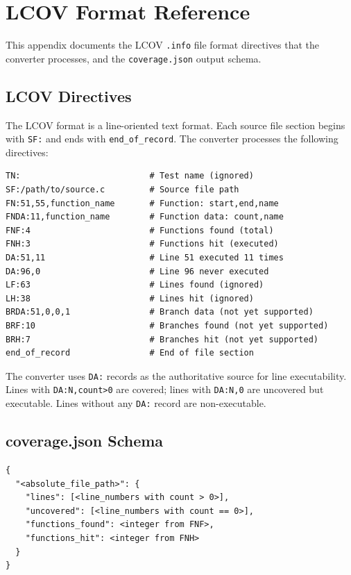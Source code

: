 \chapter{LCOV Format Reference}
\label{appx:lcov}

This appendix documents the LCOV \texttt{.info} file format directives that the converter processes, and the \texttt{coverage.json} output schema.

\section{LCOV Directives}

The LCOV format is a line-oriented text format. Each source file section begins with \texttt{SF:} and ends with \texttt{end\_of\_record}. The converter processes the following directives:

\begin{lstlisting}[caption={LCOV .info file format example}]
TN:                          # Test name (ignored)
SF:/path/to/source.c         # Source file path
FN:51,55,function_name       # Function: start,end,name
FNDA:11,function_name        # Function data: count,name
FNF:4                        # Functions found (total)
FNH:3                        # Functions hit (executed)
DA:51,11                     # Line 51 executed 11 times
DA:96,0                      # Line 96 never executed
LF:63                        # Lines found (ignored)
LH:38                        # Lines hit (ignored)
BRDA:51,0,0,1                # Branch data (not yet supported)
BRF:10                       # Branches found (not yet supported)
BRH:7                        # Branches hit (not yet supported)
end_of_record                # End of file section
\end{lstlisting}

The converter uses \texttt{DA:} records as the authoritative source for line executability. Lines with \texttt{DA:N,count>0} are covered; lines with \texttt{DA:N,0} are uncovered but executable. Lines without any \texttt{DA:} record are non-executable.

\section{coverage.json Schema}

\begin{lstlisting}[caption={coverage.json output schema}]
{
  "<absolute_file_path>": {
    "lines": [<line_numbers with count > 0>],
    "uncovered": [<line_numbers with count == 0>],
    "functions_found": <integer from FNF>,
    "functions_hit": <integer from FNH>
  }
}
\end{lstlisting}

